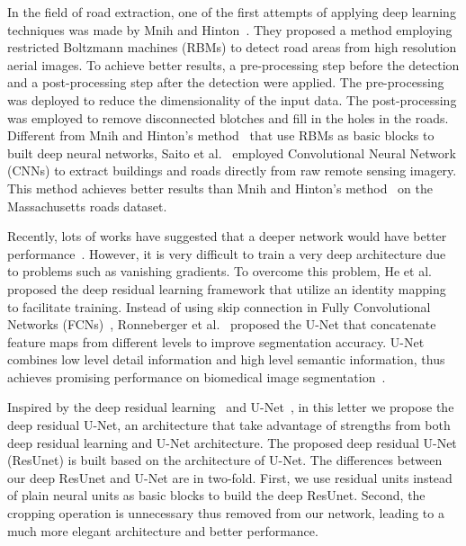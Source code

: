 \documentclass[journal]{IEEEtran}
\begin{document}
In the field of road extraction, one of the first attempts of applying deep learning techniques was made by Mnih and Hinton~\cite{mnih2010learning}. They proposed a method employing restricted Boltzmann machines (RBMs) to detect road areas from high resolution aerial images. To achieve better results, a pre-processing step before the detection and a post-processing step after the detection were applied. The pre-processing was deployed to reduce the dimensionality of the input data. The post-processing was employed to remove disconnected blotches and fill in the holes in the roads. Different from Mnih and Hinton's method~\cite{mnih2010learning} that use RBMs as basic blocks to built deep neural networks, Saito et al.~\cite{Saito2016Multiple} employed Convolutional Neural Network (CNNs) to extract buildings and roads directly from raw remote sensing imagery. This method achieves better results than Mnih and Hinton's method~\cite{mnih2010learning} on the Massachusetts roads dataset.

Recently, lots of works have suggested that a deeper network would have better performance~\cite{szegedy2015going,simonyan2014very}. However, it is very difficult to train a very deep architecture due to problems such as vanishing gradients. To overcome this problem, He et al.~\cite{resnet2015deep} proposed the deep residual learning framework that utilize an identity mapping~\cite{resnet2016} to facilitate  training. Instead of using skip connection in Fully Convolutional Networks (FCNs)~\cite{FCN2015fully}, Ronneberger et al.~\cite{U-NET2015} proposed the U-Net that concatenate  feature maps from different levels to improve segmentation accuracy. U-Net combines low level detail information and high level semantic information, thus achieves promising performance on biomedical image segmentation~\cite{U-NET2015}. 

Inspired by the deep residual learning~\cite{resnet2015deep} and U-Net~\cite{U-NET2015}, in this letter we propose the deep residual U-Net, an architecture that take advantage of strengths from both deep residual learning and U-Net architecture. The proposed deep residual U-Net (ResUnet) is built based on the architecture of U-Net. The differences between our deep ResUnet and U-Net are in two-fold. First, we use residual units instead of plain neural units as basic blocks to build the deep ResUnet. Second, the cropping operation is unnecessary thus removed from our network, leading to a much more elegant architecture and better performance. 


\vspace{-0.3cm}
\end{document}
